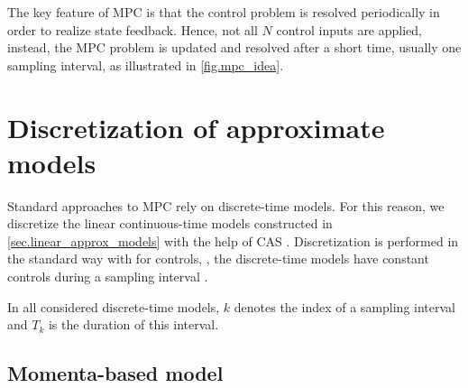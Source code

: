 The key feature of \ac{MPC} is that the control problem is resolved
periodically in order to realize state feedback. Hence, not all $N$ control
inputs are applied, instead, the \ac{MPC} problem is updated and resolved after
a short time, usually one sampling interval, as illustrated in
\cref{fig.mpc_idea}.


\section{Discretization of approximate models}\label{sec.approx_models_discret}

Standard approaches to \ac{MPC} rely on discrete-time models. For this reason,
we discretize the linear continuous-time models constructed in
\cref{sec.linear_approx_models} with the help of  \ac{CAS}
\cite{MAXIMAsite}. Discretization is performed in the standard way with
 for controls, \IE, the discrete-time models have constant
controls during a sampling interval \cite[Chapter~1]{BaoCang2010mpc}.


In all considered discrete-time models, $k$ denotes the index of a sampling
interval and $T_k$ is the duration of this interval.



\subsection{Momenta-based model}\label{sec.momenta_model_discret}

